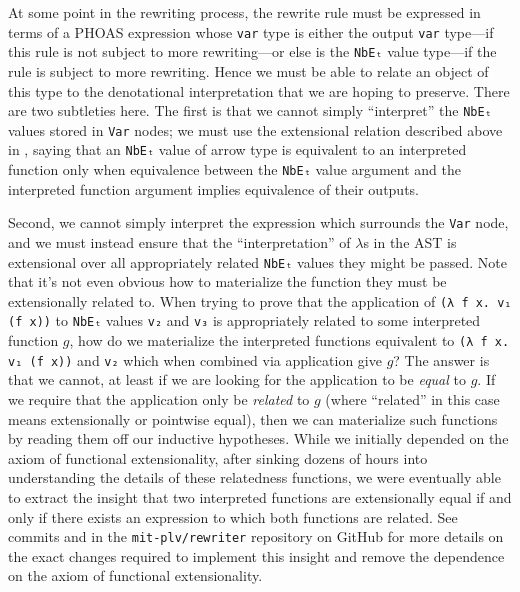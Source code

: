 At some point in the rewriting process, the rewrite rule must be expressed in terms of a PHOAS expression whose \texttt{var} type is either the output \texttt{var} type---if this rule is not subject to more rewriting---or else is the \texttt{NbEₜ} value type---if the rule is subject to more rewriting.
Hence we must be able to relate an object of this type to the denotational interpretation that we are hoping to preserve.
There are two subtleties here.
The first is that we cannot simply ``interpret'' the \texttt{NbEₜ} values stored in \texttt{Var} nodes; we must use the extensional relation described above in , saying that an \texttt{NbEₜ} value of arrow type is equivalent to an interpreted function only when equivalence between the \texttt{NbEₜ} value argument and the interpreted function argument implies equivalence of their outputs.

Second, we cannot simply interpret the expression which surrounds the \texttt{Var} node, and we must instead ensure that the ``interpretation'' of $\lambda$s in the AST is extensional over all appropriately related \texttt{NbEₜ} values they might be passed.
Note that it's not even obvious how to materialize the function they must be extensionally related to.
When trying to prove that the application of \texttt{(λ f x. v₁ (f x))} to \texttt{NbEₜ} values \texttt{v₂} and \texttt{v₃} is appropriately related to some interpreted function $g$, how do we materialize the interpreted functions equivalent to \texttt{(λ f x. v₁ (f x))} and \texttt{v₂} which when combined via application give $g$?
The answer is that we cannot, at least if we are looking for the application to be \emph{equal} to $g$.
If we require that the application only be \emph{related} to $g$ (where ``related'' in this case means extensionally or pointwise equal), then we can materialize such functions by reading them off our inductive hypotheses.
While we initially depended on the axiom of functional extensionality, after sinking dozens of hours into understanding the details of these relatedness functions, we were eventually able to extract the insight that two interpreted functions are extensionally equal if and only if there exists an expression to which both functions are related.
See commits  and  in the \texttt{mit-plv/rewriter} repository on GitHub for more details on the exact changes required to implement this insight and remove the dependence on the axiom of functional extensionality.

